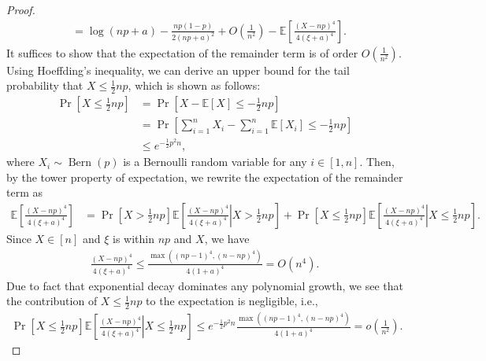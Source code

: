 \documentclass[onecolumn,romanappendices,10pt]{IEEEtran}
\newcommand{\EE}{{\mathbb{E}}}
\DeclareMathOperator{\Bernoulli}{Bern}
\begin{document}
\begin{proof}
\begin{equation}
\begin{aligned}
				&= \log (np + a) - \frac{np (1 - p)}{2 (np + a)^2} + O\left( \frac{1}{n^2} \right) - \EE \left[ \frac{(X - np)^4}{4 (\xi + a)^4} \right].
			\end{aligned}
		\end{equation}
		It suffices to show that the expectation of the remainder term is of order $O(\frac{1}{n^2})$. Using Hoeffding's inequality, we can derive an upper bound for the tail probability that $X \leq \frac{1}{2} np$, which is shown as follows:
		\begin{equation}
			\begin{aligned}
				\Pr\left[ X \leq \frac{1}{2} np \right] &= \Pr\left[ X - \EE \left[ X \right] \leq -\frac{1}{2} np \right] \\
				&= \Pr\left[\sum_{i=1}^{n} X_i - \sum_{i=1}^{n} \EE \left[ X_i \right] \leq - \frac{1}{2} np \right] \\
				&\leq e^{-\frac{1}{2} p^2 n},
			\end{aligned}
		\end{equation}
		where $X_i \sim \Bernoulli(p)$ is a Bernoulli random variable for any $i \in [1, n]$. Then, by the tower property of expectation, we rewrite the expectation of the remainder term as
		\begin{equation}
			\begin{aligned}
				\EE \left[ \frac{(X - np)^4}{4 (\xi + a)^4} \right] &= \Pr\left[ X > \frac{1}{2} np \right] \EE \left[ \left. \frac{(X - np)^4}{4 (\xi + a)^4} \right| X > \frac{1}{2}np \right] + \Pr\left[ X \leq \frac{1}{2} np \right] \EE \left[ \left. \frac{(X - np)^4}{4 (\xi + a)^4} \right| X \leq \frac{1}{2}np \right].
			\end{aligned}\label{eq:exp_remainder}
		\end{equation}
		Since $X \in [n]$ and $\xi$ is within $np$ and $X$, we have 
		\begin{equation}
			\begin{aligned}
				\frac{(X - np)^4}{4 (\xi + a)^4} \leq \frac{\max((np-1)^4, (n-np)^4)}{4(1+a)^4} = O(n^4).
			\end{aligned}
		\end{equation}
		Due to fact that exponential decay dominates any polynomial growth, we see that the contribution of $X \leq \frac{1}{2} np$ to the expectation is negligible, i.e.,
		\begin{equation}
			\begin{aligned}
				\Pr\left[ X \leq \frac{1}{2} np \right] \EE \left[ \left. \frac{(X - np)^4}{4 (\xi + a)^4} \right| X \leq \frac{1}{2}np \right] \leq e^{-\frac{1}{2} p^2 n} \frac{\max((np-1)^4, (n-np)^4)}{4(1+a)^4} = o(\frac{1}{n^2}).

\end{aligned}
\end{equation}
\end{proof}
\end{document}
